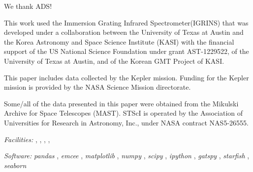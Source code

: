 \documentclass[twocolumn]{emulateapj}%
\newcommand{\project}[1]{\textsl{#1}}
\begin{document}
We thank ADS!

This work used the Immersion Grating Infrared Spectrometer(IGRINS) that was developed under a collaboration between the University of Texas at Austin and the Korea Astronomy and Space Science Institute (KASI) with the financial support of the US National Science Foundation under grant AST-1229522, of the University of Texas at Austin, and of the Korean GMT Project of KASI.

This paper includes data collected by the Kepler mission. Funding for the Kepler mission is provided by the NASA Science Mission directorate.

Some/all of the data presented in this paper were obtained from the Mikulski Archive for Space Telescopes (MAST). STScI is operated by the Association of Universities for Research in Astronomy, Inc., under NASA contract NAS5-26555.


{\it Facilities:} , , , , 

{\it Software: }
 \project{pandas} \citep{mckinney10},
 \project{emcee} \citep{foreman13},
 \project{matplotlib} \citep{hunter07},
 \project{numpy} \citep{vanderwalt11},
 \project{scipy} \citep{jones01},
 \project{ipython} \citep{perez07},
 \project{gatspy} \citep{JakeVanderplas2015},
 \project{starfish} \citep{czekala15},
 \project{seaborn} \citep{waskom14}

\clearpage



\end{document}
